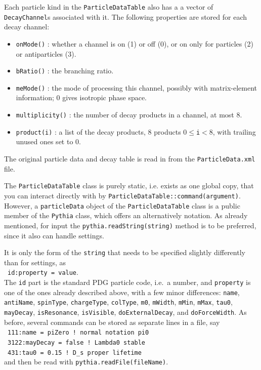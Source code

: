 \documentclass{elsartmod}
\newcommand{\cindent}{\hspace*{10mm}~}
\begin{document}
Each particle kind in the \texttt{ParticleDataTable} also has a 
a vector of \texttt{DecayChannel}s associated with it. The following 
properties are stored for each decay channel:
\begin{itemize} 
\item \texttt{onMode()} : 
whether a channel is on (1) or off (0), or on only for particles
(2) or antiparticles (3).
\item \texttt{bRatio()} : 
the branching ratio.
\item \texttt{meMode()} : 
the mode of processing this channel, possibly with 
matrix-element information; 0 gives isotropic phase space.
\item \texttt{multiplicity()} : 
the number of decay products in a channel, at most 8.
\item \texttt{product(i)} : 
a list of the decay products, 8 products $0 \leq $\texttt{i}$ < 8$,
with trailing unused ones set to 0.
\end{itemize}

The original particle data and decay table is read in from the 
\texttt{ParticleData.xml} file.

The \texttt{ParticleDataTable} class is purely static, i.e. exists as
one global copy, that you can interact directly with by
\texttt{ParticleDataTable::command(argument)}. However, a
\texttt{particleData} object of the \texttt{ParticleDataTable} class
is a public member of the \texttt{Pythia} class, which offers an
alternatively notation. As already mentioned, for input the
\texttt{pythia.readString(string)} method is to be preferred, since it
also can handle settings.

It is only the form of the \texttt{string} that needs to be specified
slightly differently than for settings, as\\ 
\cindent \texttt{id:property = value}.\\ 
The \texttt{id} part is the standard PDG particle code, i.e.\ a number, 
and \texttt{property} is one of the ones already described above, 
with a few minor differences: \texttt{name}, \texttt{antiName}, 
\texttt{spinType}, \texttt{chargeType}, \texttt{colType}, \texttt{m0}, 
\texttt{mWidth}, \texttt{mMin}, \texttt{mMax}, \texttt{tau0}, 
\texttt{mayDecay}, \texttt{isResonance}, \texttt{isVisible}, 
\texttt{doExternalDecay}, and \texttt{doForceWidth}. As before, several 
commands can be stored as separate lines in a file, say\\ 
\cindent \texttt{111:name = piZero  ! normal notation pi0}\\ 
\cindent \texttt{3122:mayDecay = false ! Lambda0 stable}\\  
\cindent \texttt{431:tau0 = 0.15 ! D\_s proper lifetime}\\
and then be read with \texttt{pythia.readFile(fileName)}.
\end{document}
